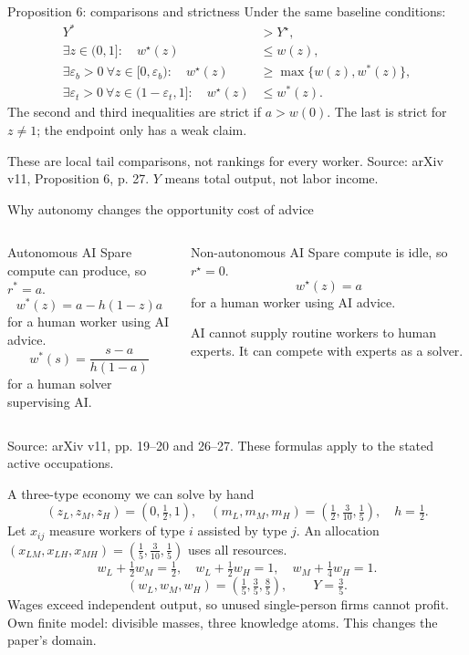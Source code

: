 \documentclass[aspectratio=169,11pt]{beamer}
\newcommand{\ai}{a}
\newcommand{\wa}{w^{*}}
\newcommand{\wc}{w^{\star}}
\newcommand{\src}[1]{\vfill{\scriptsize\color{gray}Source: arXiv v11, #1.}}
\begin{document}
\begin{frame}{Proposition 6: comparisons and strictness}
\small
Under the same baseline conditions:
\begin{align*}
Y^*&>Y^\star,\\
\exists z\in(0,1]:\quad \wc(z)&\le w(z),\\
\exists\varepsilon_b>0\ \forall z\in[0,\varepsilon_b):\quad
\wc(z)&\ge\max\{w(z),\wa(z)\},\\
\exists\varepsilon_t>0\ \forall z\in(1-\varepsilon_t,1]:\quad
\wc(z)&\le\wa(z).
\end{align*}
The second and third inequalities are strict if $\ai>w(0)$.
The last is strict for $z\ne1$; the endpoint only has a weak claim.

These are local tail comparisons, not rankings for every worker.
\src{Proposition 6, p. 27. $Y$ means total output, not labor income}
\end{frame}

\begin{frame}{Why autonomy changes the opportunity cost of advice}
\begin{columns}[T]
\begin{block}{Autonomous AI}
Spare compute can produce, so $r^*=\ai$.
\[
\wa(z)=\ai-h(1-z)\ai
\]
for a human worker using AI advice.
\[
\wa(s)=\frac{s-\ai}{h(1-\ai)}
\]
for a human solver supervising AI.
\end{block}
\begin{block}{Non-autonomous AI}
Spare compute is idle, so $r^\star=0$.
\[
\wc(z)=\ai
\]
for a human worker using AI advice.

AI cannot supply routine workers to human experts. It can compete with experts as a solver.
\end{block}
\end{columns}
\src{pp. 19--20 and 26--27. These formulas apply to the stated active occupations}
\end{frame}

\begin{frame}{A three-type economy we can solve by hand}
\[
(z_L,z_M,z_H)=(0,\tfrac12,1),\quad
(m_L,m_M,m_H)=(\tfrac12,\tfrac3{10},\tfrac15),\quad h=\tfrac12.
\]
\small
Let $x_{ij}$ measure workers of type $i$ assisted by type $j$.
An allocation $(x_{LM},x_{LH},x_{MH})=(\tfrac15,\tfrac3{10},\tfrac15)$ uses all resources.
\[
w_L+\tfrac12 w_M=\tfrac12,\quad
w_L+\tfrac12 w_H=1,\quad
w_M+\tfrac14 w_H=1.
\]
\[
\boxed{(w_L,w_M,w_H)=(\tfrac15,\tfrac35,\tfrac85)},\qquad Y=\tfrac35.
\]
Wages exceed independent output, so unused single-person firms cannot profit.
\vfill\footnotesize Own finite model: divisible masses, three knowledge atoms. This changes the paper's domain.
\end{frame}
\end{document}
